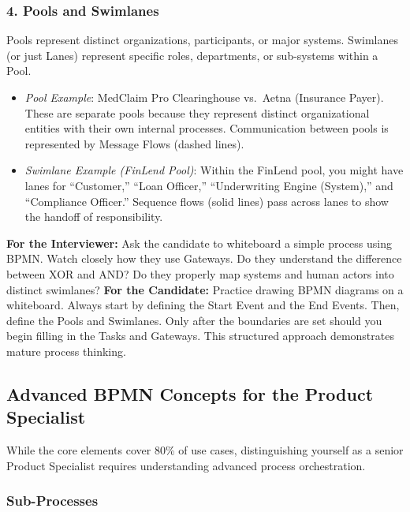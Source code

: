 \documentclass[
  11pt,
  openany,
  oneside]{book}
\providecommand{\tightlist}{%
  \setlength{\itemsep}{0pt}\setlength{\parskip}{0pt}}
\renewenvironment{quote}{\begin{customquote}}{\end{customquote}}
\begin{document}
\subsubsection{4. Pools and Swimlanes}\label{pools-and-swimlanes}

Pools represent distinct organizations, participants, or major systems.
Swimlanes (or just Lanes) represent specific roles, departments, or
sub-systems within a Pool.

\begin{itemize}
\tightlist
\item
  \emph{Pool Example}: MedClaim Pro Clearinghouse vs.~Aetna (Insurance
  Payer). These are separate pools because they represent distinct
  organizational entities with their own internal processes.
  Communication between pools is represented by Message Flows (dashed
  lines).
\item
  \emph{Swimlane Example (FinLend Pool)}: Within the FinLend pool, you
  might have lanes for ``Customer,'' ``Loan Officer,'' ``Underwriting
  Engine (System),'' and ``Compliance Officer.'' Sequence flows (solid
  lines) pass across lanes to show the handoff of responsibility.
\end{itemize}

\begin{quote}
\textbf{For the Interviewer:} Ask the candidate to whiteboard a simple
process using BPMN. Watch closely how they use Gateways. Do they
understand the difference between XOR and AND? Do they properly map
systems and human actors into distinct swimlanes? \textbf{For the
Candidate:} Practice drawing BPMN diagrams on a whiteboard. Always start
by defining the Start Event and the End Events. Then, define the Pools
and Swimlanes. Only after the boundaries are set should you begin
filling in the Tasks and Gateways. This structured approach demonstrates
mature process thinking.
\end{quote}

\subsection{Advanced BPMN Concepts for the Product
Specialist}\label{advanced-bpmn-concepts-for-the-product-specialist}

While the core elements cover 80\% of use cases, distinguishing yourself
as a senior Product Specialist requires understanding advanced process
orchestration.

\subsubsection{Sub-Processes}\label{sub-processes}
\end{document}

